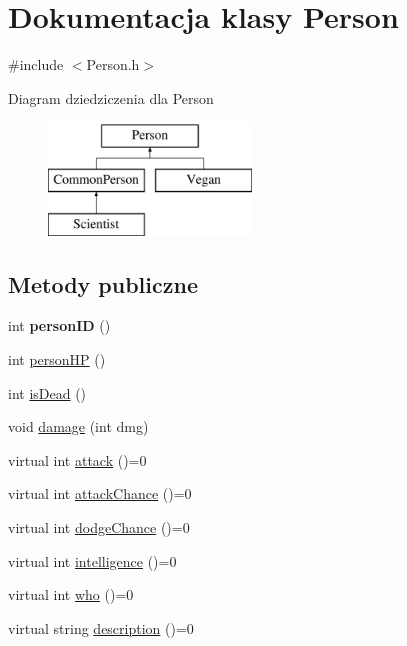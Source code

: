 \hypertarget{classPerson}{}\section{Dokumentacja klasy Person}
\label{classPerson}


{\ttfamily \#include $<$Person.\+h$>$}

Diagram dziedziczenia dla Person\begin{figure}[H]
\begin{center}
\leavevmode
\includegraphics[height=3.000000cm]{classPerson}
\end{center}
\end{figure}
\subsection*{Metody publiczne}
\begin{DoxyCompactItemize}
\item 
int {\bfseries person\+ID} ()\hypertarget{classPerson_a4ea656fa93595281740221a37e223044}{}\label{classPerson_a4ea656fa93595281740221a37e223044}

\item 
int \hyperlink{classPerson_a3054b34b9ecdc924630f54f6a8b7bc02}{person\+HP} ()
\item 
int \hyperlink{classPerson_a4d88afde6fa07378dbdb18eb50ab9e64}{is\+Dead} ()
\item 
void \hyperlink{classPerson_a5dbdaa48f3456c30c792fb40cf16b9eb}{damage} (int dmg)
\item 
virtual int \hyperlink{classPerson_a7cabe13a0c3122fa7ac0e9f005a87346}{attack} ()=0
\item 
virtual int \hyperlink{classPerson_a4f525256f6ffb3135e61bd22ff48c37a}{attack\+Chance} ()=0
\item 
virtual int \hyperlink{classPerson_adb64abc2cc5e02f1ebbc7823e7921168}{dodge\+Chance} ()=0
\item 
virtual int \hyperlink{classPerson_a3d18aad60b7ea1305e1a469d7d5fc216}{intelligence} ()=0
\item 
virtual int \hyperlink{classPerson_a7d102d6c8ed786f4ad1fcd2c3cea2f3e}{who} ()=0
\item 
virtual string \hyperlink{classPerson_aef5de94dd30ff791097a0c1444999e60}{description} ()=0
\end{DoxyCompactItemize}


